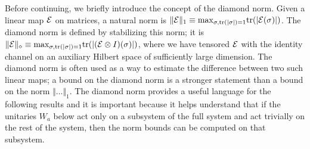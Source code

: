 \documentclass[aps,prl,amsmath,amssymb,amsfonts,superscriptaddress,floatfix]{revtex4}
\newcommand{\tr}{{\rm tr}}
\begin{document}
Before continuing, we briefly introduce the concept of the diamond norm.  Given a linear map ${\cal E}$
on matrices,
 a natural norm is $\Vert {\cal E}\Vert_1 \equiv {\rm max}_{\sigma,\tr(|\sigma|)=1} \tr(|{\cal E}(\sigma)|)$.  The diamond norm is defined by stabilizing this norm; it is $\Vert {\cal E} \Vert_\diamond\equiv {\rm max}_{\sigma, \tr(|\sigma|)=1} \tr(|({\cal E}\otimes I)(\sigma)|)$, where
 we have tensored ${\cal E}$ with the identity channel on an auxiliary Hilbert space of sufficiently large dimension.
The diamond norm is often used as a way to estimate the difference between two such linear maps; a bound
on the diamond norm is a stronger statement than a bound on the norm $\Vert \ldots \Vert_1$.
The diamond norm provides a useful language for the following results and it is important because it helps understand that if the unitaries $W_a$ below act only on a subsystem of the full system and act trivially on the rest of the system, then
 the norm bounds can be computed on that subsystem.
\end{document}
